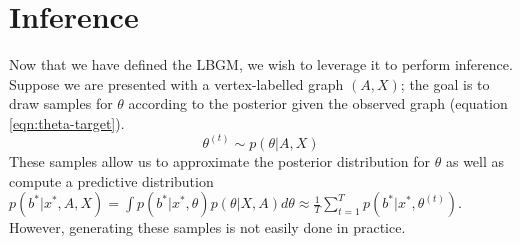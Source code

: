 \documentclass{article}
\begin{document}
\section{Inference}

Now that we have defined the LBGM, we wish to leverage it to perform inference. Suppose we are presented with a vertex-labelled graph $(A, X)$; the goal is to draw samples for $\theta$ according to the posterior given the observed graph (equation \ref{eqn:theta-target}). 
%
\begin{equation}
	\label{eqn:theta-target}
	\theta^{(t)} \sim p(\theta | A, X)
\end{equation}
%
These samples allow us to approximate the posterior distribution for $\theta$ as well as compute a predictive distribution $p(b^* | x^*, A, X) = \int p(b^* | x^*, \theta) p(\theta | X, A) d\theta \approx \frac{1}{T} \sum_{t=1}^{T} p(b^* | x^*, \theta^{(t)})$. However, generating these samples is not easily done in practice.
\end{document}
